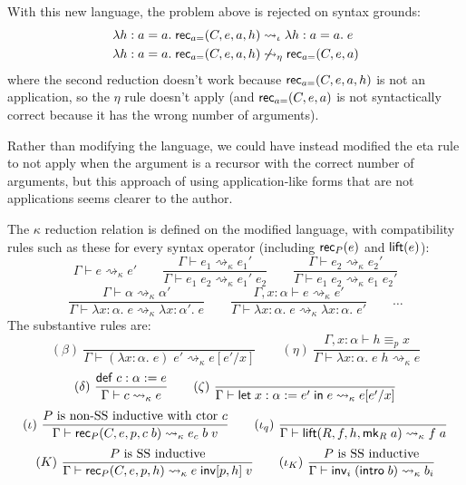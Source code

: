 With this new language, the problem above is rejected on syntax grounds:
\begin{align*}
&\lambda h:a=a.\;\mathsf{rec}_{a=}(C,e,a,h)\rightsquigarrow_\iota\lambda h:a=a.\;e\\
&\lambda h:a=a.\;\mathsf{rec}_{a=}(C,e,a,h)\not\rightsquigarrow_\eta\mathsf{rec}_{a=}(C,e,a)
\end{align*}
where the second reduction doesn't work because $\mathsf{rec}_{a=}(C,e,a,h)$ is not an application, so the $\eta$ rule doesn't apply (and $\mathsf{rec}_{a=}(C,e,a)$ is not syntactically correct because it has the wrong number of arguments).

\begin{remark}
Rather than modifying the language, we could have instead modified the eta rule to not apply when the argument is a recursor with the correct number of arguments, but this approach of using application-like forms that are not applications seems clearer to the author.
\end{remark}

The $\kappa$ reduction relation is defined on the modified language, with compatibility rules such as these for every syntax operator (including $\mathsf{rec}_P(e)$ and $\mathsf{lift}(e)$):
$$\boxed{\Gamma\vdash e\rightsquigarrow_\kappa e'}\qquad
\frac{\Gamma\vdash e_1 \rightsquigarrow_\kappa e_1'}{\Gamma\vdash e_1\;e_2\rightsquigarrow_\kappa e_1'\;e_2}\qquad
\frac{\Gamma\vdash e_2 \rightsquigarrow_\kappa e_2'}{\Gamma\vdash e_1\;e_2\rightsquigarrow_\kappa e_1\;e_2'}$$
$$\frac{\Gamma\vdash \alpha \rightsquigarrow_\kappa\alpha'}{\Gamma\vdash \lambda x:\alpha.\;e\rightsquigarrow_\kappa \lambda x:\alpha'.\;e}\qquad
\frac{\Gamma,x:\alpha\vdash e \rightsquigarrow_\kappa e'}{\Gamma\vdash \lambda x:\alpha.\;e\rightsquigarrow_\kappa \lambda x:\alpha.\;e'}\qquad\dots$$
The substantive rules are:
$$(\beta)\ \frac{}{\Gamma\vdash (\lambda x:\alpha.\;e)\;e'\rightsquigarrow_\kappa e[e'/x]}\qquad
(\eta)\ \frac{\Gamma,x:\alpha\vdash h\equiv_p x}{\Gamma\vdash \lambda x:\alpha.\;e\;h\rightsquigarrow_\kappa e}$$
$$(\delta)\ \frac{\mathsf{def}\;c:\alpha:=e}{\Gamma\vdash c\rightsquigarrow_\kappa e}\qquad
(\zeta)\ \frac{}{\Gamma\vdash \elet{x:\alpha:=e'}{e}\rightsquigarrow_\kappa e[e'/x]}$$
$$(\iota)\ \frac{P\mbox{ is non-SS inductive with ctor }c}{\Gamma\vdash \rec_P(C,e,p,c\;b)\rightsquigarrow_\kappa e_c\;b\;v}\qquad
(\iota_q)\ \frac{}{\Gamma\vdash \lift(R,f,h,\mk_R\;a)\rightsquigarrow_\kappa f\;a}$$
$$(K)\ \frac{P\mbox{ is SS inductive}}{\Gamma\vdash \rec_P(C,e,p,h)\rightsquigarrow_\kappa e\;\inv[p,h]\;v}\qquad
(\iota_K)\ \frac{P\mbox{ is SS inductive}}{\Gamma\vdash\inv_i\;(\intro\;b)\rightsquigarrow_\kappa b_i}$$

